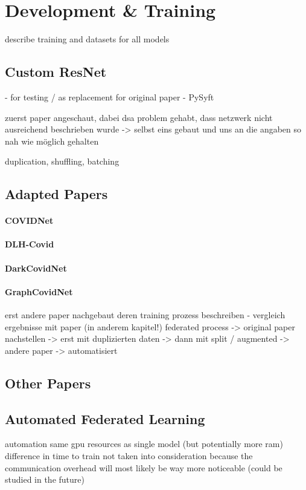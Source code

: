\section{Development \& Training}
describe training and datasets for all models

\subsection{Custom ResNet}
- for testing / as replacement for original paper
- PySyft

zuerst paper angeschaut, dabei dsa problem gehabt, dass netzwerk nicht ausreichend beschrieben wurde
-> selbst eins gebaut und uns an die angaben so nah wie möglich gehalten

duplication, shuffling, batching

\subsection{Adapted Papers}

\paragraph{COVIDNet}
\paragraph{DLH-Covid}
\paragraph{DarkCovidNet}
\paragraph{GraphCovidNet}

erst andere paper nachgebaut
deren training prozess beschreiben - vergleich ergebnisse mit paper (in anderem kapitel!)
federated process 
  -> original paper nachstellen
  -> erst mit duplizierten daten
  -> dann mit split / augmented
  -> andere paper
  -> automatisiert


\subsection{Other Papers}


\subsection{Automated Federated Learning}
automation
same gpu resources as single model (but potentially more ram)
difference in time to train not taken into consideration because the communication overhead will most likely be way more noticeable (could be studied in the future)
